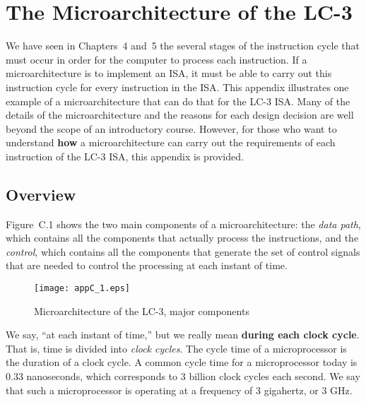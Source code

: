 \documentclass{patt}
\begin{document}
\appendix

\setcounter{chapter}{3}
\chapter*{The Microarchitecture of the LC-3}

\setcounter{chapter}{3}
\label{chapt:microarch.lc2}

We have seen in Chapters~4 and~5 the several stages of the instruction
cycle that must occur in order for the computer to process each
instruction.  If a microarchitecture is to implement an ISA, it must
be able to carry out this instruction cycle for every instruction in
the ISA.  This appendix illustrates one example of a microarchitecture
that can do that for the LC-3 ISA.  Many of the details of the
microarchitecture and the reasons for each design decision are well
beyond the scope of an introductory course.  However, for those who
want to understand {\bf how} a microarchitecture can carry out the
requirements of each instruction of the LC-3 ISA, this appendix is
provided.

\vspace{-12pt}

\section{Overview}

Figure~C.1 shows the two main components of a microarchitecture: the {\em data
  path}, which contains all the components that actually process the
instructions, and the {\em control}, which contains all the components
that generate the set of control signals that are needed to control
the processing at each instant of time.

\begin{figure}
\centerline{\texttt{[image: appC\_1.eps]}}
\caption{Microarchitecture of the LC-3, major components}
\label{fig:microblock}
\vspace{-12pt}
\end{figure}

We say, ``at each instant of time,'' but we really mean {\bf during each 
clock cycle}.  That is, time is divided into {\em clock cycles}.  The cycle 
time of a microprocessor is the duration of a clock cycle.  A common cycle 
time for a microprocessor today is 0.33 nanoseconds, which corresponds 
to 3 billion clock cycles each second.  We say that such a microprocessor 
is operating at a frequency of 3 gigahertz, or 3 GHz.
\end{document}
